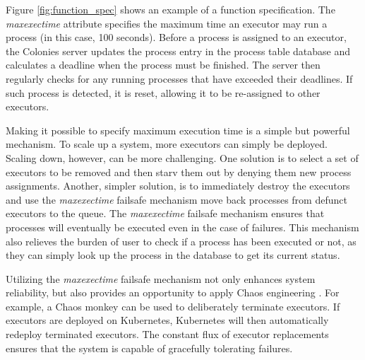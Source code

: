 \documentclass{article}
\begin{document}
Figure \ref{fig:function_spec} shows an example of a function specification. The \emph{maxexectime} attribute specifies the maximum time an executor may run a process (in this case, 100 seconds). Before a process is assigned to an executor, the Colonies server updates the process entry in the process table database and calculates a deadline when the process must be finished. The server then regularly checks for any running processes that have exceeded their deadlines. If such process is detected, it is reset, allowing it to be re-assigned to other executors. 

Making it possible to specify maximum execution time is a simple but powerful mechanism. To scale up a system, more executors can simply be deployed. Scaling down, however, can be more challenging. One solution is to select a set of executors to be removed and then starv them out by denying them new process assignments. Another, simpler solution, is to immediately destroy the executors and use the \emph{maxexectime} failsafe mechanism move back processes from defunct executors to the queue. The \emph{maxexectime} failsafe mechanism ensures that processes will eventually be executed even in the case of failures. This mechanism also relieves the burden of user to check if a process has been executed or not, as they can simply look up the process in the database to get its current status. 

Utilizing the \emph{maxexectime} failsafe mechanism not only enhances system reliability, but also provides an opportunity to apply Chaos engineering \cite{chaos_engineering}. For example, a Chaos monkey can be used to deliberately terminate executors. If executors are deployed on Kubernetes, Kubernetes will then automatically redeploy terminated executors. The constant flux of executor replacements ensures that the system is capable of gracefully tolerating failures.
\end{document}
